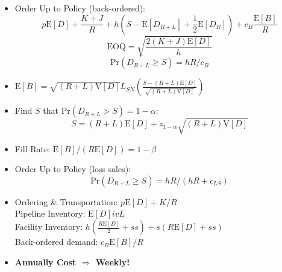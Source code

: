 \documentclass[10pt, twocolumn]{article}
\begin{document}
\begin{itemize}
\item Order Up to Policy (back-ordered): 
\[ p\text{E}[D] + \frac{K+J}{R} + h(S-\text{E}[D_{R+L}]+\frac{1}{2}\text{E}[D_R]) + c_B\frac{\text{E}[B]}{R} \]
\[ \text{EOQ} = \sqrt{\frac{2(K+J)\text{E}[D]}{h}} \]
\[ \text{Pr}(D_{R+L} \geq S) = hR/c_B \]
\item $\text{E}[B] = \sqrt{(R+L)\text{V}[D]}L_{SN}\left(\frac{S-(R+L)\text{E}[D]}{\sqrt{(R+L)\text{V}[D]}}\right)$
\item Find $S$ that $\text{Pr}(D_{R+L}>S)=1-\alpha$: 
\[ S = (R+L)\text{E}[D]+z_{1-\alpha}\sqrt{(R+L)\text{V}[D]} \]
\item Fill Rate: $\text{E}[B]/(R\text{E}[D])=1-\beta$
\item Order Up to Policy (loss sales):
\[ \text{Pr}(D_{R+L} \geq S) = hR/(hR+c_{LS}) \]
\item Ordering \& Transportation: $p\text{E}[D]+K/R$ \\
Pipeline Inventory: $\text{E}[D]ivL$ \\
Facility Inventory: $h(\frac{R\text{E}[D]}{2}+ss)+s(R\text{E}[D]+ss)$ \\
Back-ordered demand: $c_B\text{E}[B]/R$
\item \large{\textbf{Annually Cost $\Rightarrow$ Weekly!}}
\end{itemize}
\end{document}
